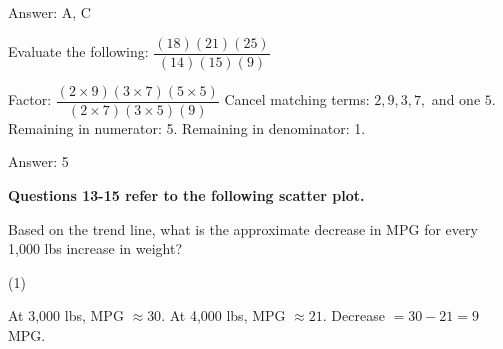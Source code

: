 \documentclass[11pt,paper=a4,answers]{exam}
\begin{document}
\begin{questions}
\begin{solution}
Answer: \colorbox{yellow!100}{A, C}
\end{solution}

\vspace{1cm}


\question
Evaluate the following: $\dfrac{(18)(21)(25)}{(14)(15)(9)}$

\begin{solution}
\begin{center}
Factor: $\dfrac{(2 \times 9)(3 \times 7)(5 \times 5)}{(2 \times 7)(3 \times 5)(9)}$
\vspace{5pt}
Cancel matching terms: $2, 9, 3, 7,$ and one $5$.
\vspace{5pt}
Remaining in numerator: 5. Remaining in denominator: 1.
\end{center}

Answer: \colorbox{yellow!100}{5}
\end{solution}

\vspace{1cm}

\textbf{Questions 13-15 refer to the following scatter plot.}

\begin{center}
\end{center}

\question
Based on the trend line, what is the approximate decrease in MPG for every 1,000 lbs increase in weight?

\begin{tasks}(1)
    
\end{tasks}

\begin{solution}
\begin{center}
At 3,000 lbs, MPG $\approx 30$. At 4,000 lbs, MPG $\approx 21$.
\vspace{5pt}
Decrease $= 30 - 21 = 9$ MPG.
\end{center}


\end{solution}
\end{questions}
\end{document}

